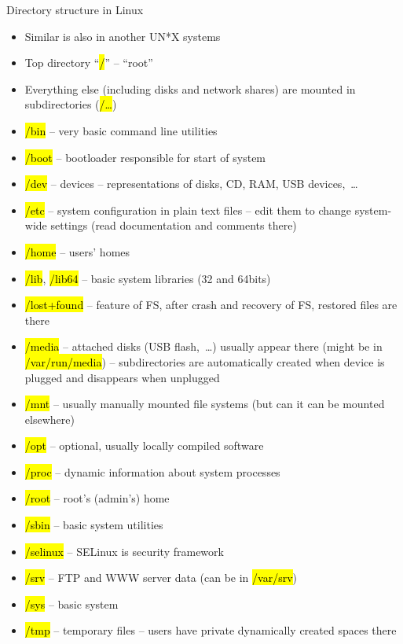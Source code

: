 \documentclass[compress, ucs, xelatex, 11pt, xcolor=svgnames,
  hyperref={
    bookmarks=true,
    unicode=true,
    colorlinks=true,
    pdftitle={Linux, command line and MetaCentrum},
    plainpages=false,
    pdfauthor={Vojtech Zeisek},
    pdfsubject={Course about use of Linux command line, writing shell scripts and using MetaCentrum of CESNET},
    pdfcreator={XeLaTeX},
    pdfkeywords={Linux, GNU, BASH, shell, command line, MetaCentrum},
    linkcolor=DarkRed,
    anchorcolor=DarkBlue,
    citecolor=Indigo,
    filecolor=NavyBlue,
    menucolor=DarkMagenta,
    urlcolor=DarkBlue,
    pdftex},
  url={hyphens, lowtilde} %
  ]{beamer}
\renewcommand{\texttt}[1]{\hl{\ttfamily #1}}
\renewcommand{\alert}[1]{\textcolor{red}{#1}}
\begin{document}
\begin{frame}[allowframebreaks]{Directory structure in Linux}
  \begin{itemize}
    \item Similar is also in another UN*X systems
    \item Top directory ``\texttt{/}'' -- ``root''
    \item Everything else (including disks and network shares) are mounted in subdirectories (\texttt{/\ldots})
    \item \texttt{/bin} -- very basic command line utilities
    \item \texttt{/boot} -- bootloader responsible for start of system
    \item \texttt{/dev} -- devices -- representations of disks, CD, RAM, USB devices,~\ldots
    \item \alert{\texttt{/etc}} -- system configuration in plain text files -- edit them to change system-wide settings (read documentation and comments there)
    \item \alert{\texttt{/home}} -- users' homes
    \item \texttt{/lib}, \texttt{/lib64} -- basic system libraries (32 and 64bits)
    \item \texttt{/lost+found} -- feature of FS, after crash and recovery of FS, restored files are there
    \item \alert{\texttt{/media}} -- attached disks (USB flash,~\ldots) usually appear there (might be in \texttt{/var/run/media}) -- subdirectories are automatically created when device is plugged and disappears when unplugged
    \item \texttt{/mnt} -- usually manually mounted file systems (but can it can be mounted elsewhere)
    \item \texttt{/opt} -- optional, usually locally compiled software
    \item \texttt{/proc} -- dynamic information about system processes
    \item \texttt{/root} -- root's (admin's) home
    \item \texttt{/sbin} -- basic system utilities
    \item \texttt{/selinux} -- SELinux is security framework
    \item \texttt{/srv} -- FTP and WWW server data (can be in \texttt{/var/srv})
    \item \texttt{/sys} -- basic system
    \item \texttt{/tmp} -- temporary files -- users have private dynamically created spaces there

\end{itemize}
\end{frame}
\end{document}
